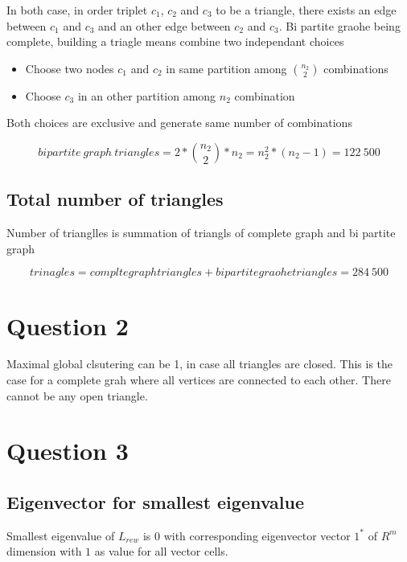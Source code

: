 \documentclass[a4paper]{article}
\begin{document}
In both case, in order triplet $c_{1}$, $c_{2}$ and $c_{3}$ to be a triangle, there exists an edge between $c_{1}$ and $c_{3}$ and an other edge between $c_{2}$ and $c_{3}$. Bi partite graohe being complete, building a triagle means combine two independant choices
\begin{itemize}
\item Choose two nodes $c_{1}$ and $c_{2}$ in same partition among $\binom{n_{2}}{2}$ combinations
\item Choose $c_{3}$  in an other partition among $n_{2}$ combination
\end{itemize}

Both choices are exclusive and generate same number of combinations

\begin{equation}
bipartite\ graph\ triangles = 2 * \binom{n_{2}}{2} * n_{2} = n_{2}^{2}*(n_{2} - 1) = 122\ 500
\end{equation}


\subsection{ Total number of triangles}

Number of trianglles is summation of triangls of complete graph and bi partite graph

\begin{equation}
trinagles = complte graph triangles + bipartite graohe triangles = \boxed{284\ 500}
\end{equation}

\section{Question 2}

Maximal global clsutering can be 1, in case all triangles are closed. This is the case for a complete grah where all vertices are connected to each other. There cannot be any open triangle.

\section{Question 3}


\subsection{Eigenvector for smallest eigenvalue}
Smallest eigenvalue of $L_{rew}$ is 0 with corresponding eigenvector  vector $1^{*}$ of $R^{m}$ dimension with $1$ as value for all vector cells.
\end{document}
